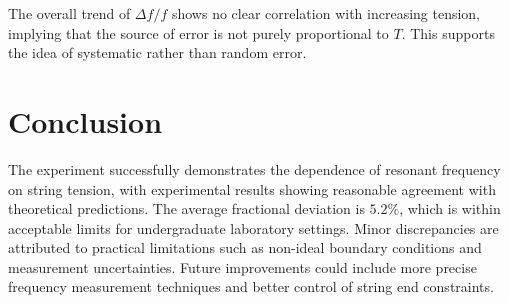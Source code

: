 \documentclass[12pt]{article}
\begin{document}
The overall trend of \(\Delta f / f\) shows no clear correlation with increasing tension, implying that the source of error is not purely proportional to \(T\). This supports the idea of systematic rather than random error.

\section*{Conclusion}
The experiment successfully demonstrates the dependence of resonant frequency on string tension, with experimental results showing reasonable agreement with theoretical predictions. The average fractional deviation is \(5.2\%\), which is within acceptable limits for undergraduate laboratory settings. Minor discrepancies are attributed to practical limitations such as non-ideal boundary conditions and measurement uncertainties. Future improvements could include more precise frequency measurement techniques and better control of string end constraints.
\end{document}
